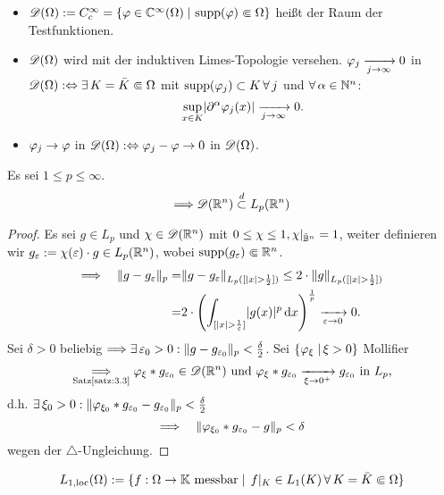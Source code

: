 \begin{defi}
  \begin{itemize}
  \item $\mathscr{D}(\Omega):=C_c^\infty=\{\varphi\in\mathbb{C}^\infty(\Omega)\;\vert\,\operatorname{supp}(\varphi)\Subset\Omega\}$ heißt der Raum der Testfunktionen.
  \item $\mathscr{D}(\Omega)$ wird mit der induktiven Limes-Topologie versehen. $\varphi_j\xrightarrow[j\rightarrow\infty]{}0$ in $\mathscr{D}(\Omega):\Leftrightarrow\exists \, K=\bar K\Subset\Omega$ mit $\operatorname{supp}(\varphi_j)\subset K\, \forall \,j$ und $\forall\,\alpha\in\mathbb{N}^n$:
    \[ \sup_{x\in K}\lvert \partial^\alpha\varphi_j(x)\rvert\xrightarrow[j\rightarrow\infty]{}0. \]
  \item $\varphi_j\rightarrow\varphi$ in $\mathscr{D}(\Omega):\Leftrightarrow\varphi_j-\varphi\rightarrow0$ in $\mathscr{D}(\Omega)$.
  \end{itemize}
\end{defi}

\begin{satz}\label{satz:3.4}
  Es sei $1\leq p\leq\infty$.
  \[ \Longrightarrow \mathscr{D}(\mathbb{R}^n)\overset{d}\subset L_p(\mathbb{R}^n) \]
\end{satz}

\begin{proof}
  Es sei $g\in L_p$ und $ \chi\in\mathscr{D}(\mathbb{R}^n)$ mit $ 0\leq\chi\leq 1, \chi\vert_{\bar{\mathbb{B}}^n}=1$, weiter definieren wir $g_\varepsilon:=\chi(\varepsilon)\cdot g\in L_p(\mathbb{R}^n)$, wobei $ \operatorname{supp}(g_\varepsilon)\Subset\mathbb{R}^n$.
  \begin{align*}
    \Longrightarrow\quad \lVert g-g_\varepsilon\rVert_p=&\lVert g-g_\varepsilon\rVert_{L_p([\lvert x\rvert>\frac 12])}
    \leq2\cdot\lVert g\rVert_{L_p([\lvert x\rvert>\frac 12])} \\
    =&2\cdot\left(
      \int_{[\lvert x\rvert>\frac 1{\varepsilon}]}\lvert g(x)\rvert^p\,\mathrm{d} x
    \right)^{\frac 1p}\xrightarrow[\varepsilon\rightarrow0]{}0.
  \end{align*}
  Sei $\delta>0$ beliebig $\Longrightarrow\exists\,\varepsilon_0>0:\lVert g-g_{\varepsilon_0}\rVert_p<\frac\delta2$. Sei $\{\varphi_\xi\;\vert\,\xi>0\}$ Mollifier 
  $$\underset{\scriptsize\text{Satz}\ref{satz:3.3}}{\Longrightarrow}\varphi_\xi\ast g_{\varepsilon_0}\in\mathscr{D}(\mathbb{R}^n) \text{ und }\varphi_\xi\ast g_{\varepsilon_0}\xrightarrow[\xi\rightarrow0^+]{}g_{\varepsilon_0} \text{ in } L_p,$$
   d.h. $\exists\,\xi_0>0: \lVert \varphi_{\xi_0}\ast g_{\varepsilon_0}-g_{\varepsilon_0}\rVert_p<\frac\delta2$
  \[ \Longrightarrow\quad\lVert \varphi_{\xi_0}\ast g_{\varepsilon_0}-g\rVert_p<\delta \]
  wegen der $\triangle$-Ungleichung.
\end{proof}

\begin{defi}
  \[L_{1,\scriptsize{\textnormal{loc}}}(\Omega):=\{f:\Omega\rightarrow\mathbb{K}\text{ messbar}\;\vert\,\; f\vert_K\in L_1(K)\, \forall\, K=\bar K\Subset\Omega\}\]
\end{defi}

